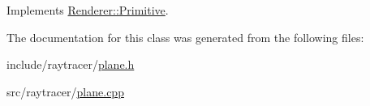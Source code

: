 Implements \hyperlink{classRenderer_1_1Primitive_a203efa6754633a8559c441a4de603b2d}{Renderer\+::\+Primitive}.



The documentation for this class was generated from the following files\+:\begin{DoxyCompactItemize}
\item 
include/raytracer/\hyperlink{plane_8h}{plane.\+h}\item 
src/raytracer/\hyperlink{plane_8cpp}{plane.\+cpp}\end{DoxyCompactItemize}
